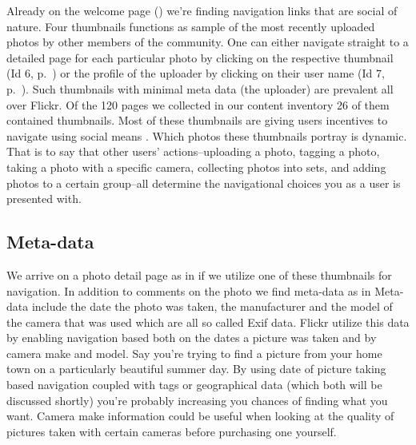 Already on the welcome page ()
we're finding navigation links that are social of
nature. Four thumbnails functions as sample of the most recently uploaded
photos by other members of the community. One can either navigate straight to
a detailed page for each particular photo by clicking on the respective
thumbnail (Id 6, p.~\pageref{table:flickr.content.inventory.6})
or the profile of the uploader by clicking on their user
name (Id 7, p.~\pageref{table:flickr.content.inventory.7}). Such thumbnails
with minimal meta data (the uploader) are prevalent all over Flickr. Of the
120 pages we collected in our content inventory 26 of them contained
thumbnails. Most of these thumbnails
are giving users incentives to navigate using social means%
.
Which photos these thumbnails portray is dynamic. That is to say that other
users' actions--uploading a photo, tagging a photo, taking a photo with a
specific camera, collecting photos into sets, and adding photos to a certain
group--all determine the navigational choices you as a user is
presented with.

\subsection{Meta-data}

We arrive on a photo detail page as in
if we utilize one of these thumbnails for navigation. In addition to comments
on the photo we find meta-data as in 
Meta-data include the date the photo was taken, the manufacturer and the model
of the camera that was used which are all so called Exif%
data. Flickr utilize this data by enabling navigation based both on the
dates a picture was taken and by camera make and model. Say you're trying to
find a picture from your home town on a particularly beautiful summer day. By
using date of picture taking based navigation coupled with tags or
geographical data (which both will be discussed shortly) you're probably
increasing you chances of finding what you want. Camera make information could
be useful when looking at the quality of pictures taken with certain cameras
before purchasing one yourself.

